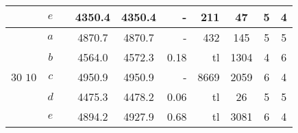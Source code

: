 \begin{table}[!htb]
\begin{tabular}{cccccrrccc}
& $e$ & & 4350.4 & 4350.4 & - & 211 & 47 & 5 & 4 \\
\hline
\multirow{5}{*}{$30$  \hspace{4mm} $10$}
& $a$ & & 4870.7 & 4870.7 & - & 432 & 145 & 5 & 5 \\
& $b$ & & 4564.0 & 4572.3 & 0.18 & tl & 1304 & 4 & 6 \\
& $c$ & & 4950.9 & 4950.9 & - & 8669 & 2059 & 6 & 4 \\
& $d$ & & 4475.3 & 4478.2 & 0.06 & tl & 26 & 5 & 5 \\
& $e$ & & 4894.2 & 4927.9 & 0.68 & tl & 3081 & 6 & 4 \\
\hline
\end{tabular}
\label{tab:PDPCD-ReqsFixed}
\end{table}
